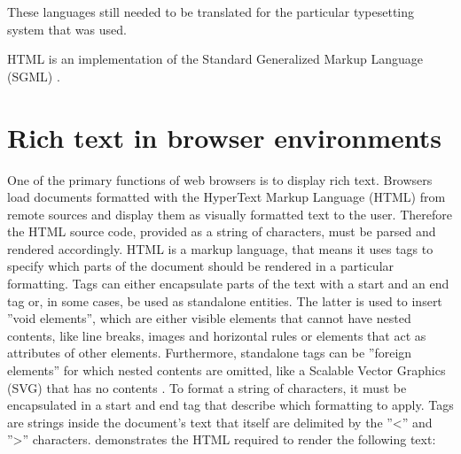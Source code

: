 These languages still needed to be translated for the particular typesetting system that was used. 









HTML is an implementation of the Standard Generalized Markup Language (SGML) \cite{ISO8879}.

\section{Rich text in browser environments}

One of the primary functions of web browsers is to display rich text. Browsers load documents formatted with the HyperText Markup Language (HTML) from remote sources and display them as visually formatted text to the user.
Therefore the HTML source code, provided as a string of characters, must be parsed and rendered accordingly. HTML is a markup language, that means it uses tags to specify which parts of the document should be rendered in a particular formatting. Tags can either encapsulate parts of the text with a start and an end tag or, in some cases, be used as standalone entities. 
The latter is used to insert ''void elements'', which are either visible elements that cannot have nested contents, like line breaks, images and horizontal rules or elements that act as attributes of other elements. Furthermore, standalone tags can be ''foreign elements'' for which nested contents are omitted, like a Scalable Vector Graphics (SVG) that has no contents \cite[Elements]{HTML5}. 
To format a string of characters, it must be encapsulated in a start and end tag that describe which formatting to apply. Tags are strings inside the document's text that itself are delimited by the ''<'' and ''>'' characters.  demonstrates the HTML required to render the following text:

